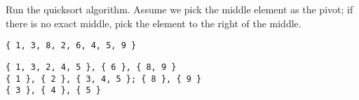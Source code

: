 \question Run the quicksort algorithm. Assume we pick the middle element as the pivot; if there is no exact middle, pick the element to the right of the middle.

\begin{verbatim}
{ 1, 3, 8, 2, 6, 4, 5, 9 }
\end{verbatim}

\begin{solution}[1in]
\begin{verbatim}
{ 1, 3, 2, 4, 5 }, { 6 }, { 8, 9 }
{ 1 }, { 2 }, { 3, 4, 5 }; { 8 }, { 9 }
{ 3 }, { 4 }, { 5 }
\end{verbatim}
\end{solution}